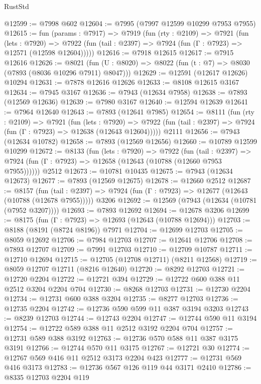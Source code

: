 \begin{lexlean}{RustStd}
\begin{coremodule}
{\begin{coremodule}
{{{{{{{{{{{{{{{{{{{{{{{{{{{{{{{{{{{{{{{{{{{{{{{{{{@12599 := @7998 @602
@12604 := @7995 (@7997 @12599 @10299 @7953 @7955)
@12615 := fun (params : @7917) =>
  @7919
    (fun (rty : @2109) =>
    @7921
      (fun (lets : @7920) =>
      @7922 (fun (tail : @2397) => @7924 (fun (Γ : @7923) => @12571 (@12598 @12604)))))
@12616 := @7918 @12615
@12617 := @7915 @12616
@12626 := @8021
    (fun (U : @8020) => @8022 (fun (t : @7) => @8030 (@7893 (@8036 @10296 @7911) @8047)))
@12629 := @12591 (@12617 @12626) @10294
@12631 := @7878 @12616 @12626
@12633 := @8108 @12615 @3167
@12634 := @7945 @3167
@12636 := @7943 (@12634 @7958)
@12638 := @7893 (@12569 @12636)
@12639 := @7980 @3167
@12640 := @12594 @12639
@12641 := @7964 @12640
@12643 := @7893 (@12641 @7985)
@12654 := @8111
    (fun (rty : @2109) =>
    @7921
      (fun (lets : @7920) =>
      @7922 (fun (tail : @2397) => @7924 (fun (Γ : @7923) => @12638 (@12643 @12604)))))
    @2111
@12656 := @7943 (@12634 @10782)
@12658 := @7893 (@12569 @12656)
@12660 := @10789 @12599 @10299
@12672 := @8133
    (fun (lets : @7920) =>
    @7922
      (fun (tail : @2397) =>
      @7924 (fun (Γ : @7923) => @12658 (@12643 (@10788 (@12660 @7953 @7955))))))
    @2512
@12673 := @10781 @10435
@12675 := @7943 (@12634 @12673)
@12677 := @7893 (@12569 @12675)
@12678 := @12660 @2512
@12687 := @8157
    (fun (tail : @2397) => @7924 (fun (Γ : @7923) => @12677 (@12643 (@10788 (@12678 @7955)))))
    @3206
@12692 := @12569 (@7943 (@12634 (@10781 (@7952 @3207))))
@12693 := @7893 @12692
@12694 := @12678 @3206
@12699 := @8175 (fun (Γ : @7923) => @12693 (@12643 (@10788 @12694)))
@12703 := @8188 (@8191 (@8724 @8196)) @7971
@12704 := @12699 @12703
@12705 := @8059 @12692
@12706 := @7984 @12703
@12707 := @12641 @12706
@12708 := @7893 @12707
@12709 := @7991 @12703
@12710 := @12709 @10787
@12711 := @12710 @12694
@12715 := @12705 (@12708 @12711) (@8211 @12568)
@12719 := @8059 @12707 @12711 (@8216 @12640)
@12720 := @8292 @12703
@12721 := @12720 @2204
@12722 := @12721 @394
@12729 := @12722 @600 @388 @11 @2512 @3204 @2204 @704
@12730 := @8268 @12703
@12731 := @12730 @2204
@12734 := @12731 @600 @388 @3204
@12735 := @8277 @12703
@12736 := @12735 @2204
@12742 := @12736 @590 @599 @11 @387 @3194 @3203
@12743 := @8239 @12703
@12744 := @12743 @2204
@12747 := @12744 @590 @11 @3194
@12754 := @12722 @589 @388 @11 @2512 @3192 @2204 @704
@12757 := @12731 @589 @388 @3192
@12763 := @12736 @570 @588 @11 @387 @3175 @3191
@12766 := @12744 @570 @11 @3175
@12767 := @12721 @30
@12774 := @12767 @569 @416 @11 @2512 @3173 @2204 @423
@12777 := @12731 @569 @416 @3173
@12783 := @12736 @567 @126 @119 @44 @3171 @2410
@12786 := @8335 @12703 @2204 @119
}}}}}}}}}}}}}}}}}}}}}}}}}}}}}}}}}}}}}}}}}}}}}}}}}}
\end{coremodule}}
\end{coremodule}
\end{lexlean}
